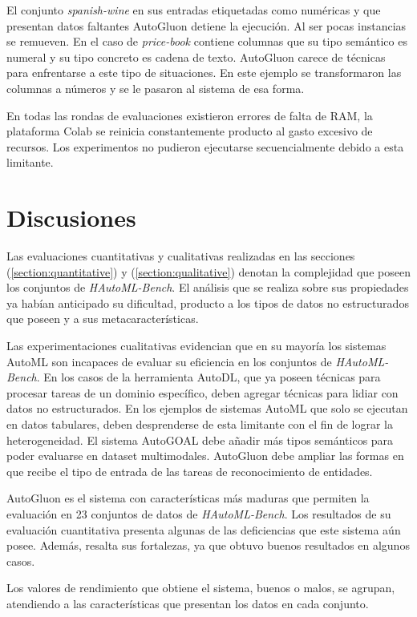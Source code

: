 El conjunto \textit{spanish-wine} en sus entradas etiquetadas como numéricas y que presentan datos faltantes AutoGluon detiene la ejecución. Al ser pocas instancias 
se remueven.
En el caso de \textit{price-book} contiene columnas que su tipo semántico es numeral y su tipo concreto es cadena de texto. AutoGluon carece de técnicas para 
enfrentarse a este tipo de situaciones. En este ejemplo se transformaron las columnas a números y se le pasaron al sistema de esa forma.

En todas las rondas de evaluaciones existieron errores de falta de RAM, la plataforma Colab se reinicia constantemente producto al gasto excesivo de recursos. Los 
experimentos no pudieron ejecutarse secuencialmente debido a esta limitante.

\section{Discusiones}\label{subsection:discussions}

Las evaluaciones cuantitativas y cualitativas realizadas en las secciones (\ref{section:quantitative}) y (\ref{section:qualitative}) denotan la complejidad que poseen 
los conjuntos de \textit{HAutoML-Bench}.
El análisis que se realiza sobre sus propiedades ya habían anticipado su dificultad, producto a los tipos de datos no estructurados que poseen y a sus metacaracterísticas.

Las experimentaciones cualitativas evidencian que en su mayoría los sistemas AutoML son incapaces de evaluar su eficiencia en los conjuntos de \textit{HAutoML-Bench}. 
En los casos de la herramienta AutoDL, que ya poseen técnicas para procesar tareas de un dominio específico, deben agregar técnicas para lidiar con datos no estructurados. 
En los ejemplos de sistemas AutoML que solo se ejecutan en datos tabulares, deben desprenderse de esta limitante con el fin de lograr la heterogeneidad. 
El sistema AutoGOAL debe añadir más tipos semánticos para poder evaluarse en dataset multimodales. AutoGluon debe ampliar las formas en que recibe el tipo de entrada 
de las tareas de reconocimiento de entidades.

AutoGluon es el sistema con características más maduras que permiten la evaluación en 23 conjuntos de datos de \textit{HAutoML-Bench}.
Los resultados de su evaluación cuantitativa presenta algunas de las deficiencias que este sistema aún posee. Además, resalta sus fortalezas, ya que obtuvo buenos resultados 
en algunos casos.

Los valores de rendimiento que obtiene el sistema, buenos o malos, se agrupan, atendiendo a las características que presentan los datos en cada conjunto.

